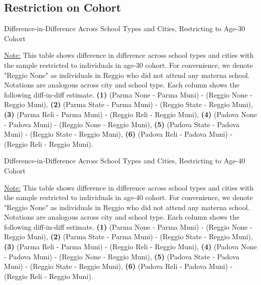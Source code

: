 \documentclass[11pt]{article}
\begin{document}
\subsection{Restriction on Cohort}
\begin{table}[H]
\begin{center}
	\caption{Difference-in-Difference Across School Types and Cities, Restricting to Age-30 Cohort}
	\scalebox{0.80}{
		}
\end{center}
\footnotesize
\underline{Note:} This table shows difference in difference across school types and cities with the sample restricted to individuals in age-30 cohort. For convenience, we denote "Reggio None" as individuals in Reggio who did not attend any materna school. Notations are analogous across city and school type. Each column shows the following diff-in-diff estimate. \textbf{(1)} (Parma None - Parma Muni) - (Reggio None - Reggio Muni), \textbf{(2)} (Parma State - Parma Muni) - (Reggio State - Reggio Muni), \textbf{(3)} (Parma Reli - Parma Muni) - (Reggio Reli - Reggio Muni), \textbf{(4)} (Padova None - Padova Muni) - (Reggio None - Reggio Muni),  \textbf{(5)} (Padova State - Padova Muni) - (Reggio State - Reggio Muni), \textbf{(6)} (Padova Reli - Padova Muni) - (Reggio Reli - Reggio Muni). 
\end{table}

\begin{table}[H]
\begin{center}
	\caption{Difference-in-Difference Across School Types and Cities, Restricting to Age-40 Cohort}
	\scalebox{0.80}{
		}
\end{center}
\footnotesize
\underline{Note:} This table shows difference in difference across school types and cities with the sample restricted to individuals in age-40 cohort. For convenience, we denote "Reggio None" as individuals in Reggio who did not attend any materna school. Notations are analogous across city and school type. Each column shows the following diff-in-diff estimate. \textbf{(1)} (Parma None - Parma Muni) - (Reggio None - Reggio Muni), \textbf{(2)} (Parma State - Parma Muni) - (Reggio State - Reggio Muni), \textbf{(3)} (Parma Reli - Parma Muni) - (Reggio Reli - Reggio Muni), \textbf{(4)} (Padova None - Padova Muni) - (Reggio None - Reggio Muni),  \textbf{(5)} (Padova State - Padova Muni) - (Reggio State - Reggio Muni), \textbf{(6)} (Padova Reli - Padova Muni) - (Reggio Reli - Reggio Muni). 
\end{table}
\end{document}
